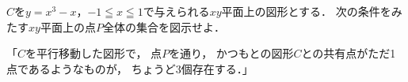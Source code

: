 \documentclass[../../main.tex]{subfiles}
\begin{document}
$C$を$y=x^3-x$，$-1 \leqq x \leqq 1$で与えられる$xy$平面上の図形とする．
次の条件をみたす$xy$平面上の点$P$全体の集合を図示せよ．

「$C$を平行移動した図形で，
点$P$を通り，
かつもとの図形$C$との共有点がただ1点であるようなものが，
ちょうど3個存在する．」
\end{document}
